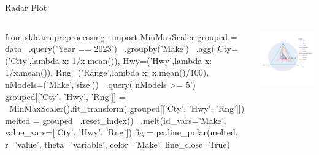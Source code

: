 \documentclass[ignorenonframetext,xcolor=x11names]{beamer}
\begin{document}


\begin{frame}[fragile]{Radar Plot}
\begin{columns}
\begin{column}{.67\textwidth}
\begin{pythoncode}
from sklearn.preprocessing \
  import MinMaxScaler
grouped = data \
  .query('Year == 2023') \
  .groupby('Make') \
  .agg(
    Cty=('City',lambda x: 1/x.mean()),
    Hwy=('Hwy',lambda x: 1/x.mean()),
    Rng=('Range',lambda x: x.mean()/100),
    nModels=('Make','size')) \
  .query('nModels >= 5')
grouped[['Cty', 'Hwy', 'Rng']] = \
  MinMaxScaler().fit_transform(
    grouped[['Cty', 'Hwy', 'Rng']])
melted = grouped \
  .reset_index() \
  .melt(id_vars='Make', 
    value_vars=['Cty', 'Hwy', 'Rng'])
fig = px.line_polar(melted, 
     r='value', theta='variable', 
     color='Make', 
     line_close=True)
\end{pythoncode}
\end{column}
\begin{column}{.5\textwidth}
  \includegraphics[width=\textwidth]{px.fuel.radar.pdf}
  \end{column}
\end{columns}
\end{frame}
\end{document}

